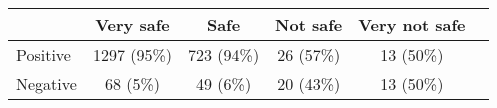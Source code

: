 \begin{tabular}{l c|c|c|c|c} \hline  & Very safe & Safe & Not safe & Very not safe \\ 
\hline Positive & 1297 (95\%) & 723 (94\%) & 26 (57\%) & 13 (50\%) \\ 
  Negative & 68 (5\%) & 49 (6\%) & 20 (43\%) & 13 (50\%) \\ 
 \hline \end{tabular}